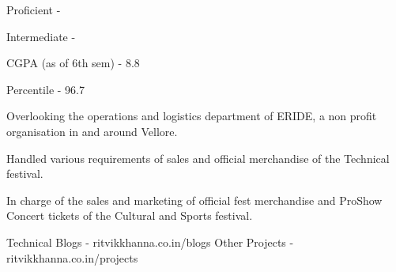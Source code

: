 








Proficient - 


Intermediate - 

\divider\smallskip



\medskip


CGPA (as of 6th sem) - 8.8

\divider\smallskip

Percentile - 96.7

\medskip

Overlooking the operations and logistics department of ERIDE, a non profit organisation in and around Vellore.

\divider\smallskip

Handled various requirements of sales and official merchandise of the Technical festival.


\divider\smallskip

In charge of the sales and marketing of official fest merchandise and ProShow Concert tickets of the Cultural and Sports festival.

\divider\smallskip

Technical Blogs - ritvikkhanna.co.in/blogs
Other Projects - ritvikkhanna.co.in/projects